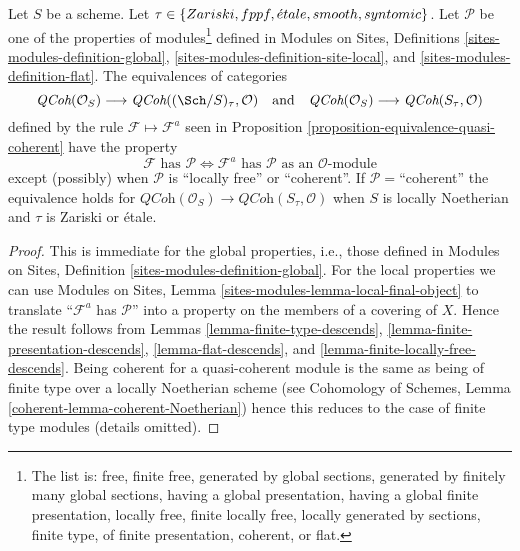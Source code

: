 \begin{lemma}
\label{lemma-equivalence-quasi-coherent-properties}
Let $S$ be a scheme.
Let $\tau \in \{Zariski, \linebreak[0] fppf, \linebreak[0]
\acute{e}tale, \linebreak[0] smooth, \linebreak[0] syntomic\}$.
Let $\mathcal{P}$ be one of the properties of modules\footnote{The list is:
free, finite free, generated by global sections, generated by finitely
many global sections, having a global presentation,
having a global finite presentation, locally free, finite locally free,
locally generated by sections, finite type, of finite presentation,
coherent, or flat.} defined in
Modules on Sites, Definitions \ref{sites-modules-definition-global},
\ref{sites-modules-definition-site-local}, and
\ref{sites-modules-definition-flat}.
The equivalences of categories
$$
\textit{QCoh}(\mathcal{O}_S)
\longrightarrow
\textit{QCoh}((\Sch/S)_\tau, \mathcal{O})
\quad\text{and}\quad
\textit{QCoh}(\mathcal{O}_S)
\longrightarrow
\textit{QCoh}(S_\tau, \mathcal{O})
$$
defined by the rule $\mathcal{F} \mapsto \mathcal{F}^a$ seen in
Proposition \ref{proposition-equivalence-quasi-coherent}
have the property
$$
\mathcal{F}\text{ has }\mathcal{P}
\Leftrightarrow
\mathcal{F}^a\text{ has }\mathcal{P}\text{ as an }\mathcal{O}\text{-module}
$$
except (possibly) when $\mathcal{P}$ is ``locally free'' or ``coherent''.
If $\mathcal{P}=$``coherent'' the equivalence
holds for $\textit{QCoh}(\mathcal{O}_S) \to \textit{QCoh}(S_\tau, \mathcal{O})$
when $S$ is locally Noetherian and $\tau$ is Zariski or \'etale.
\end{lemma}

\begin{proof}
This is immediate for the global properties, i.e., those defined in
Modules on Sites, Definition \ref{sites-modules-definition-global}.
For the local properties we can use
Modules on Sites, Lemma \ref{sites-modules-lemma-local-final-object}
to translate ``$\mathcal{F}^a$ has $\mathcal{P}$'' into a property
on the members of a covering of $X$. Hence the result follows from
Lemmas \ref{lemma-finite-type-descends},
\ref{lemma-finite-presentation-descends},
\ref{lemma-flat-descends}, and
\ref{lemma-finite-locally-free-descends}.
Being coherent for a quasi-coherent module is the same as being
of finite type over a locally Noetherian scheme (see
Cohomology of Schemes, Lemma \ref{coherent-lemma-coherent-Noetherian})
hence this reduces
to the case of finite type modules (details omitted).
\end{proof}

